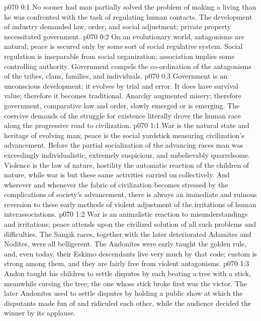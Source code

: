 \author{Melchizedek}
\vs p070 0:1 No sooner had man partially solved the problem of making a living than he was confronted with the task of regulating human contacts. The development of industry demanded law, order, and social adjustment; private property necessitated government.
\vs p070 0:2 On an evolutionary world, antagonisms are natural; peace is secured only by some sort of social regulative system. Social regulation is inseparable from social organization; association implies some controlling authority. Government compels the co\hyp{}ordination of the antagonisms of the tribes, clans, families, and individuals.
\vs p070 0:3 Government is an unconscious development; it evolves by trial and error. It does have survival value; therefore it becomes traditional. Anarchy augmented misery; therefore government, comparative law and order, slowly emerged or is emerging. The coercive demands of the struggle for existence literally drove the human race along the progressive road to civilization.
\vs p070 1:1 War is the natural state and heritage of evolving man; peace is the social yardstick measuring civilization’s advancement. Before the partial socialization of the advancing races man was exceedingly individualistic, extremely suspicious, and unbelievably quarrelsome. Violence is the law of nature, hostility the automatic reaction of the children of nature, while war is but these same activities carried on collectively. And wherever and whenever the fabric of civilization becomes stressed by the complications of society’s advancement, there is always an immediate and ruinous reversion to these early methods of violent adjustment of the irritations of human interassociations.
\vs p070 1:2 War is an animalistic reaction to misunderstandings and irritations; peace attends upon the civilized solution of all such problems and difficulties. The Sangik races, together with the later deteriorated Adamites and Nodites, were all belligerent. The Andonites were early taught the golden rule, and, even today, their Eskimo descendants live very much by that code; custom is strong among them, and they are fairly free from violent antagonisms.
\vs p070 1:3 Andon taught his children to settle disputes by each beating a tree with a stick, meanwhile cursing the tree; the one whose stick broke first was the victor. The later Andonites used to settle disputes by holding a public show at which the disputants made fun of and ridiculed each other, while the audience decided the winner by its applause.
